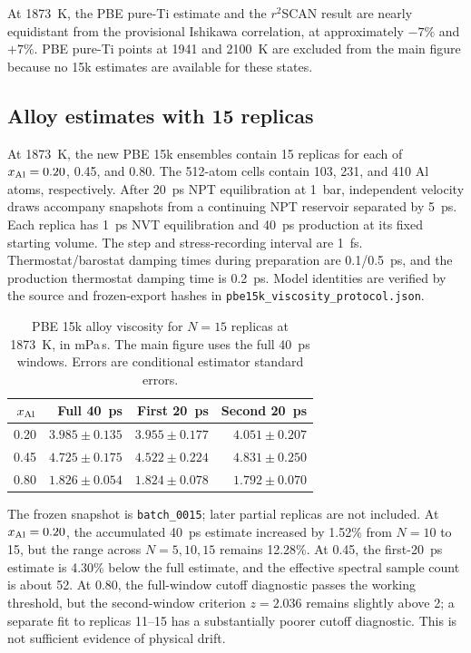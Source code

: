 \documentclass[10pt]{article}
\newcommand{\rscan}{\ensuremath{r^{2}}SCAN}
\begin{document}
At 1873~K, the PBE pure-Ti estimate and the \rscan{} result are nearly equidistant from the provisional Ishikawa correlation, at approximately $-7\%$ and $+7\%$. PBE pure-Ti points at 1941 and 2100~K are excluded from the main figure because no 15k estimates are available for these states.

\subsection{Alloy estimates with 15 replicas}
At 1873~K, the new PBE 15k ensembles contain 15 replicas for each of $x_{\rm Al}=0.20$, 0.45, and 0.80. The 512-atom cells contain 103, 231, and 410 Al atoms, respectively. After 20~ps NPT equilibration at 1~bar, independent velocity draws accompany snapshots from a continuing NPT reservoir separated by 5~ps. Each replica has 1~ps NVT equilibration and 40~ps production at its fixed starting volume. The step and stress-recording interval are 1~fs. Thermostat/barostat damping times during preparation are 0.1/0.5~ps, and the production thermostat damping time is 0.2~ps. Model identities are verified by the source and frozen-export hashes in \texttt{pbe15k\_viscosity\_protocol.json}.

\begin{table}[htbp]
\centering
\caption{PBE 15k alloy viscosity for $N=15$ replicas at 1873~K, in mPa\,s. The main figure uses the full 40~ps windows. Errors are conditional estimator standard errors.}
\label{tab:alloyN15}
\begin{tabular}{rrrr}
\toprule
$x_{\rm Al}$ & Full 40~ps & First 20~ps & Second 20~ps\\
\midrule
0.20 & $3.985\pm0.135$ & $3.955\pm0.177$ & $4.051\pm0.207$\\
0.45 & $4.725\pm0.175$ & $4.522\pm0.224$ & $4.831\pm0.250$\\
0.80 & $1.826\pm0.054$ & $1.824\pm0.078$ & $1.792\pm0.070$\\
\bottomrule
\end{tabular}
\end{table}

The frozen snapshot is \texttt{batch\_0015}; later partial replicas are not included. At $x_{\rm Al}=0.20$, the accumulated 40~ps estimate increased by 1.52\% from $N=10$ to 15, but the range across $N=5,10,15$ remains 12.28\%. At 0.45, the first-20~ps estimate is 4.30\% below the full estimate, and the effective spectral sample count is about 52. At 0.80, the full-window cutoff diagnostic passes the working threshold, but the second-window criterion $z=2.036$ remains slightly above 2; a separate fit to replicas 11--15 has a substantially poorer cutoff diagnostic. This is not sufficient evidence of physical drift.
\end{document}
